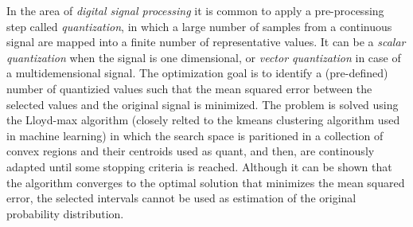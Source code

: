 In the area of \emph{digital signal processing} \cite{gersho2012vector} it is common to apply a pre-processing step called \emph{quantization}, in which a large number of samples from a continuous signal are mapped into a finite number of representative values. It can be a \emph{scalar quantization} when the signal is one dimensional, or \emph{vector quantization} in case of a multidemensional signal. The optimization goal is to identify a (pre-defined) number of quantizied values such that the mean squared error between the selected values and the original signal is minimized. The problem is solved using the Lloyd-max algorithm \cite{lloyd1982least} (closely relted to the kmeans clustering algorithm \cite{} used in machine learning) in which the search space is paritioned in a collection of convex regions and their centroids used as quant, and then, are continously adapted until some stopping criteria is reached. Although it can be shown that the algorithm converges to the optimal solution that minimizes the mean squared error, the selected intervals cannot be used as estimation of the original probability distribution.




